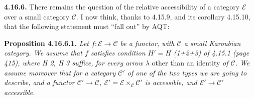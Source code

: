 \documentclass[11pt]{article}
\newcommand{\msp}[1]{\marginpar{\footnotesize [#1]}}
\begin{document}
\textbf{4.16.6.} There remains the question of the relative accessibility of a category $\mathcal{E}$ over a small category $\mathcal{C}$. I now think, thanks to 4.15.9, and its corollary 4.15.10, that the following statement must ``fall out'' by AQT:

\textbf{Proposition 4.16.6.1.} \textit{Let $f : \mathcal{E} \longrightarrow \mathcal{C}$ be a functor, with $\mathcal{C}$ a small Karoubian category. We assume that $f$ satisfies condition $H' = H$ (1+2+3) of 4.15.1 (page 415), where H 2, H 3 suffice, for every arrow $\lambda$} other than an identity \textit{of $\mathcal{C}$. We assume moreover that for a category $\mathcal{C}'$ of one of the two types we are going to describe, and a functor $\mathcal{C}' \longrightarrow \mathcal{C}$, $\mathcal{E}' = \mathcal{E} \times_{\mathcal{C}} \mathcal{C}'$ is accessible, and $\mathcal{E}' \longrightarrow \mathcal{C}'$ accessible.}

\msp{474}
\end{document}
